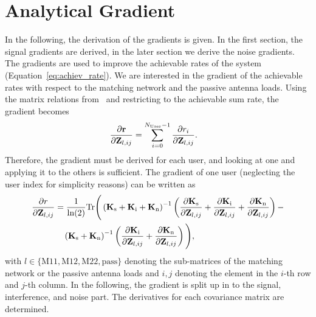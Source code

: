 \chapter{Analytical Gradient}
\label{sec:ana_grad}

In the following, the derivation of the gradients is given.
In the first section, the signal gradients are derived, in the later section we derive the noise gradients.
The gradients are used to improve the achievable rates of the system (Equation~\eqref{eq:achiev_rate}).
We are interested in the gradient of the achievable rates with respect to the matching network and the passive antenna loads.
Using the matrix relations from~\cite{Codebook12} and restricting to the achievable sum rate, the gradient becomes
\begin{align}
\label{eq:gradient}
\frac{\partial \mathbf{r}}{\partial \mathbf{Z}_{l,ij}} &=
\sum_{i=0}^{N_\text{User}-1} \frac{\partial r_i}{\partial\mathbf{Z}_{l,ij}}.
\end{align}
Therefore, the gradient must be derived for each user, and looking at one and applying it to the others is sufficient.
The gradient of one user (neglecting the user index for simplicity reasons) can be written as
\begin{align}
\label{eq:usergrad}
\frac{\partial r}{\partial\mathbf{Z}_{l,ij}} &= \frac{1}{\text{ln}(2)} 
\text{Tr}\Bigg(\left(\mathbf{K}_{\text{s}} +
	\mathbf{K}_{\text{i}} +
	\mathbf{K}_{\text{n}}\right)^{-1}
\left(\frac{\partial\mathbf{K}_{\text{s}}}{\partial\mathbf{Z}_{l,ij}}+
 	\frac{\partial\mathbf{K}_{\text{i}}}{\partial\mathbf{Z}_{l,ij}}+
 	\frac{\partial\mathbf{K}_{\text{n}}}{\partial\mathbf{Z}_{l,ij}}\right)-\\
 &\quad\left(\mathbf{K}_{\text{s}}+\mathbf{K}_{\text{n}}\right)^{-1}
 	\left(\frac{\partial\mathbf{K}_{\text{i}}}{\partial\mathbf{Z}_{l,ij}}+
 	\frac{\partial\mathbf{K}_{\text{n}}}{\partial\mathbf{Z}_{l,ij}}\right)\Bigg),
\end{align}
with $l\in\{\text{M}11,\text{M}12,\text{M}22,\text{pass}\}$ denoting the sub-matrices of the matching network or the passive antenna loads and $i,j$ denoting the element in the $i$-th row and $j$-th column.
In the following, the gradient is split up in to the signal, interference, and noise part.
The derivatives for each covariance matrix are determined.

